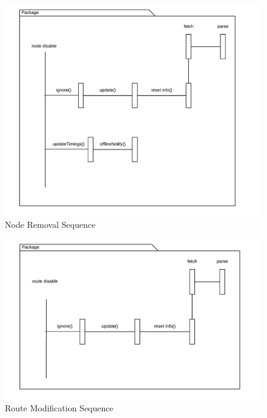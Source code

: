 \documentclass[12pt,a4paper,final]{report}
\begin{document}
	\begin{figure}[!h]
		\begin{center}
			\includegraphics[scale=0.6]{Diagrams/Node_Disable_Sequence.jpeg}
		\end{center}
		\caption{Node Removal Sequence}
	\end{figure}
	\begin{figure}[!h]
		\begin{center}
			\includegraphics[scale=0.6]{Diagrams/Route_Disable_Sequence.jpeg}
		\end{center}
		\caption{Route Modification Sequence}
	\end{figure}
\end{document}
